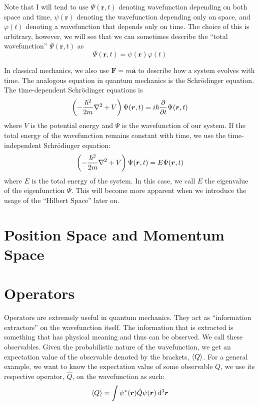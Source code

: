 \documentclass[oneside]{book}
\numberwithin{figure}{section}
\numberwithin{equation}{section}
\newcommand{\paren}[1]{\left(#1\right)}
\theoremstyle{definition}
\begin{document}
	Note that I will tend to use $ \Psi(\bm{r},t) $ denoting wavefunction depending on both space and time, $ \psi(\bm{r}) $ denoting the wavefunction depending only on space, and $ \varphi(t) $ denoting a wavefunction that depends only on time. The choice of this is arbitrary, however, we will see that we can sometimes describe the ``total wavefunction'' $ \Psi(\bm{r},t) $ as
	\begin{equation}
		\Psi(\bm{r},t) = \psi(\bm{r})\varphi(t)
	\end{equation}
	
	In classical mechanics, we also use $ \bm{F} = m\bm{a} $ to describe how a system evolves with time. The analogous equation in quantum mechanics is the Schrödinger equation. The time-dependent Schrödinger equations is
	\begin{equation}
		\paren{-\dfrac{\hbar^2}{2m}\laplacian + V}\Psi(\bm{r},t) = i\hbar\pdv{t}\Psi(\bm{r},t)
	\end{equation}
	where $ V $ is the potential energy and $ \Psi $ is the wavefunction of our system. If the total energy of the wavefunction remains constant with time, we use the time-independent Schrödinger equation:
	\begin{equation}
		\paren{-\dfrac{\hbar^2}{2m}\laplacian + V}\Psi(\bm{r},t) = E\Psi(\bm{r},t)
	\end{equation}
	where $ E $ is the total energy of the system. In this case, we call $ E $ the eigenvalue of the eigenfunction $ \Psi $. This will become more apparent when we introduce the usage of the ``Hilbert Space'' later on.
	
	\section{Position Space and Momentum Space}

	\section{Operators}
	Operators are extremely useful in quantum mechanics. They act as ``information extractors'' on the wavefunction itself. The information that is extracted is something that has physical meaning and thus can be observed. We call these observables. Given the probabilistic nature of the wavefunction, we get an expectation value of the observable denoted by the brackets, $ \expval{Q} $. For a general example, we want to know the expectation value of some observable $ Q $, we use its respective operator, $ \hat{Q} $, on the wavefunction as such:
	\begin{equation}
		\expval{Q} = \int\psi^*(\bm{r})\hat{Q}\psi(\bm{r})\dd[3]{\bm{r}}
	\end{equation}
\end{document}

